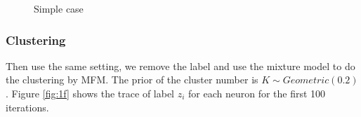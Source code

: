 \documentclass{article}
\begin{document}
\begin{figure}[h!]
		\caption{Simple case}
	\end{figure}
	
	\subsubsection{Clustering}
	Then use the same setting, we remove the label and use the mixture model to do the clustering by MFM. The prior of the cluster number is $K\sim Geometric(0.2)$. Figure \ref{fig:1f} shows the trace of label $z_i$ for each neuron for the first 100 iterations.
	
\end{document}
